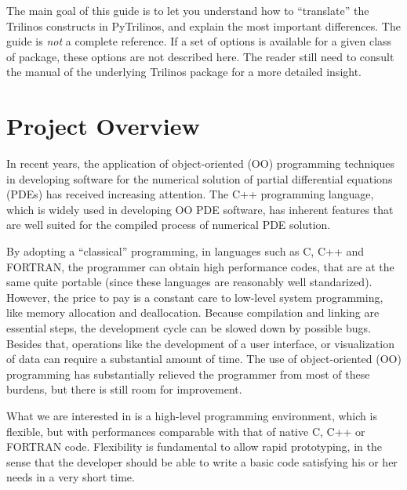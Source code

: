 \documentclass[10pt,relax]{SANDreport}
\begin{document}
The main goal of this guide is to let you understand how to ``translate'' the
Trilinos constructs in PyTrilinos, and explain the most important differences.
The guide is {\sl not} a complete reference. If a set of options is available
for a given class of package, these options are not described here. The reader
still need to consult the manual of the underlying Trilinos package for a more
detailed insight.


\section{Project Overview}
\label{sec:overview}

In recent years, the application of object-oriented (OO) programming
techniques in developing software for the numerical solution of partial
differential equations (PDEs) has received increasing attention. The C++
programming language, which is widely used in developing OO PDE software, has
inherent features that are well suited for the compiled process of numerical
PDE solution.

By adopting a ``classical'' programming, in languages such as C, C++ and
FORTRAN, the programmer can  obtain high performance codes, that are at the
same quite portable (since these languages are reasonably well standarized).
However, the price to pay is a constant care to low-level system programming,
  like memory allocation and deallocation. Because compilation and linking are
  essential steps, the development cycle can be slowed down by possible bugs.
  Besides that, operations like the development of a user interface, or
  visualization of data can require a substantial amount of time. The use of
  object-oriented (OO) programming has substantially relieved the programmer
  from most of these burdens, but there is still room for improvement.

What we are interested in is a high-level programming environment, which is
flexible, but with performances comparable with that of native C, C++ or
FORTRAN code. Flexibility is fundamental to allow rapid prototyping, in the
sense that the developer should be able to write a basic code satisfying his
or her needs in a very short time. 
\end{document}
